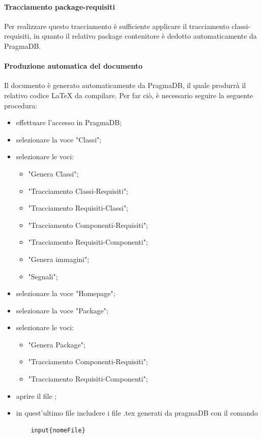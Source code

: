  \paragraph{Tracciamento package-requisiti}
 Per realizzare questo tracciamento è sufficiente applicare il tracciamento classi-requisiti, in quanto il relativo package contenitore è dedotto automaticamente da PragmaDB.
 \paragraph{Produzione automatica del documento \DPdoc}
 Il documento \DPdoc{} è generato automaticamente da PragmaDB, il quale produrrà il relativo codice \LaTeX{} da compilare.
 Per far ciò, è necessario seguire la seguente procedura:
 \begin{itemize}
 	\item effettuare l'accesso in PragmaDB;
 	\item selezionare la voce "Classi";
 	\item selezionare le voci:
 	\begin{itemize}
 		\item "Genera Classi";
 		\item "Tracciamento Classi-Requisiti";
 		\item "Tracciamento Requisiti-Classi";
 		\item "Tracciamento Componenti-Requisiti";
 		\item "Tracciamento Requisiti-Componenti";
 		\item "Genera immagini";
 		\item "Segnali";
 	\end{itemize}
 	\item selezionare la voce "Homepage";
 	\item selezionare la voce "Package";
 	\item selezionare le voci:
 	\begin{itemize}
 		\item "Genera Package";
 		\item "Tracciamento Componenti-Requisiti";
 		\item "Tracciamento Requisiti-Componenti";
 	\end{itemize}
 	\item aprire il file \DPfile;
 	\item in quest'ultimo file includere i file .tex generati da pragmaDB con il comando \begin{lstlisting}
 	input{nomeFile}
 	\end{lstlisting}

\end{itemize}
